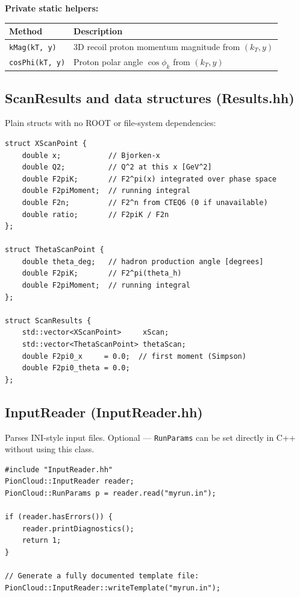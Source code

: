 \documentclass[11pt,a4paper]{article}
\newcommand{\code}[1]{\texttt{#1}}
\begin{document}
\textbf{Private static helpers:}

\begin{center}
\begin{tabular}{lp{8cm}}
\toprule
\textbf{Method} & \textbf{Description} \\
\midrule
\code{kMag(kT, y)}   & 3D recoil proton momentum magnitude from $(k_T, y)$ \\
\code{cosPhi(kT, y)} & Proton polar angle $\cos\phi_k$ from $(k_T, y)$ \\
\bottomrule
\end{tabular}
\end{center}

\subsection{ScanResults and data structures (Results.hh)}

Plain structs with no ROOT or file-system dependencies:

\begin{lstlisting}[style=cppstyle]
struct XScanPoint {
    double x;           // Bjorken-x
    double Q2;          // Q^2 at this x [GeV^2]
    double F2piK;       // F2^pi(x) integrated over phase space
    double F2piMoment;  // running integral
    double F2n;         // F2^n from CTEQ6 (0 if unavailable)
    double ratio;       // F2piK / F2n
};

struct ThetaScanPoint {
    double theta_deg;   // hadron production angle [degrees]
    double F2piK;       // F2^pi(theta_h)
    double F2piMoment;  // running integral
};

struct ScanResults {
    std::vector<XScanPoint>     xScan;
    std::vector<ThetaScanPoint> thetaScan;
    double F2pi0_x     = 0.0;  // first moment (Simpson)
    double F2pi0_theta = 0.0;
};
\end{lstlisting}

\subsection{InputReader (InputReader.hh)}

Parses INI-style input files.  Optional --- \code{RunParams} can be
set directly in C++ without using this class.

\begin{lstlisting}[style=cppstyle]
#include "InputReader.hh"
PionCloud::InputReader reader;
PionCloud::RunParams p = reader.read("myrun.in");

if (reader.hasErrors()) {
    reader.printDiagnostics();
    return 1;
}

// Generate a fully documented template file:
PionCloud::InputReader::writeTemplate("myrun.in");
\end{lstlisting}
\end{document}
